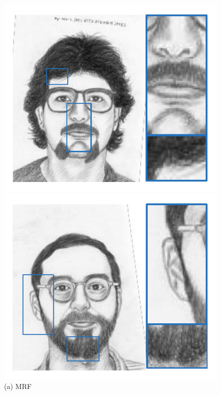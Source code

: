 \documentclass[10pt,twocolumn,letterpaper]{article}
\begin{document}
\begin{figure}[htbp]
\begin{minipage}[t]{0.138\linewidth}
\includegraphics[width=0.99\linewidth]{img/example3_gro.pdf}
\includegraphics[width=0.99\linewidth]{img/example4_gro.pdf}
(a) MRF
\end{minipage}
\begin{minipage}[t]{0.138\linewidth}
\centering

\end{minipage}
\end{figure}
\end{document}
